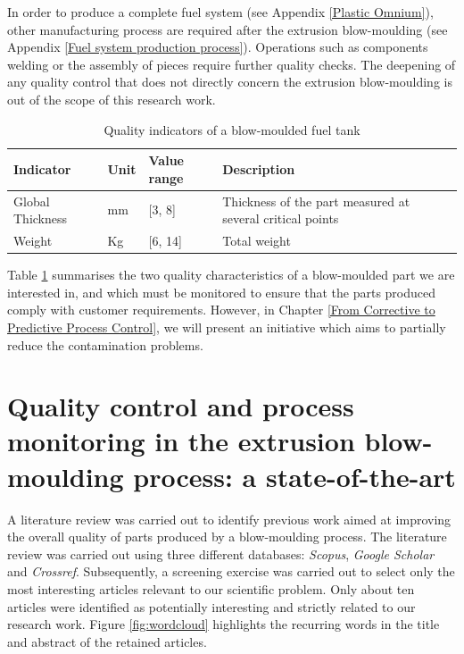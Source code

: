 In order to produce a complete fuel system (see Appendix \ref{Plastic Omnium}), other manufacturing process are required after the extrusion blow-moulding (see Appendix \ref{Fuel system production process}). Operations such as components welding or the assembly of pieces require further quality checks. The deepening of any quality control that does not directly concern the extrusion blow-moulding is out of the scope of this research work.  
%
\begin{table}
\caption{Quality indicators of a blow-moulded fuel tank }
\label{tab:quality_inidcators}
\begin{tabular}{@{}lllp{6cm}@{}}
\toprule
\textbf{Indicator} & \textbf{Unit} & \textbf{Value range} & \textbf{Description}                                                 \\ 
\midrule
Global Thickness           & mm                        & {[}3, 8{]}           & Thickness of the part measured at several critical points \\ 
Weight & Kg & {[}6, 14{]} & Total weight \\ 
\bottomrule
\end{tabular}
\end{table}
%
Table \ref{tab:quality_inidcators} summarises the two quality characteristics of a blow-moulded part we are interested in, and which must be monitored to ensure that the parts produced comply with customer requirements. However, in Chapter \ref{From Corrective to Predictive Process Control}, we will present an initiative which aims to partially reduce the contamination problems.

\section{Quality control and process monitoring in the extrusion blow-moulding process: a state-of-the-art} \label{state-of-the-art}

A literature review was carried out to identify previous work aimed at improving the overall quality of parts produced by a blow-moulding process. The literature review was carried out using three different databases: \textit{Scopus}, \textit{Google Scholar} and \textit{Crossref}. Subsequently, a screening exercise was carried out to select only the most interesting articles relevant to our scientific problem. Only about ten articles were identified as potentially interesting and strictly related to our research work. Figure \ref{fig:wordcloud} highlights the recurring words in the title and abstract of the retained articles. 

